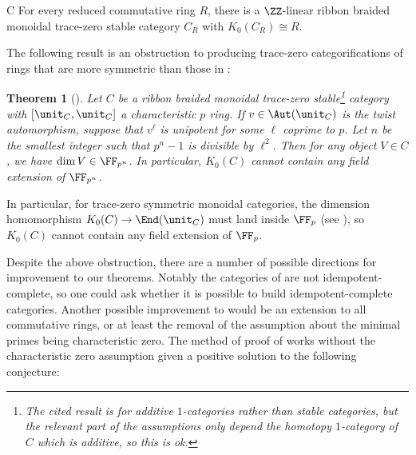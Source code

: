 \documentclass[12pt,oneside]{article}
\newcounter{counter}
\newtheorem{thm}[counter]{Theorem}
\newtheorem{lem}[counter]{Lemma}
\begin{document}
	\begin{customthm}{C}\label{thm:trzero}
		For every reduced commutative ring $R$, there is a $\ZZ$-linear ribbon braided monoidal trace-zero stable category $C_R$ with $K_0(C_R) \cong R$.
	\end{customthm}

	The following result is an obstruction to producing trace-zero categorifications of rings that are more symmetric than those in :

	\begin{thm}[{\cite[Theorem 5.15]{etingof2021lectures}}]\label{thm:obstruction}
			Let $C$ be a ribbon braided monoidal trace-zero stable\footnote{The cited result is for additive $1$-categories rather than stable categories, but the relevant part of the assumptions only depend the homotopy $1$-category of $C$ which is additive, so this is ok.} category with $[\unit_C,\unit_C]$ a characteristic $p$ ring. If $v\in \Aut(\unit_C)$ is the twist automorphism, suppose that $v^\ell$ is unipotent for some $\ell$ coprime to $p$. Let $n$ be the smallest integer such that $p^n-1$ is divisible by $\ell^2$. Then for any object $V \in C$, we have $\dim V \in \FF_{p^n}$. In particular, $K_0(C)$ cannot contain any field extension of $\FF_{p^n}$.
		\end{thm}
	In particular, for trace-zero symmetric monoidal categories, the dimension homomorphism $K_0(C) \to \End(\unit_C)$ must land inside $\FF_p$ (see \cite[Lemma 3.13]{etingof2021lectures}), so $K_0(C)$ cannot contain any field extension of $\FF_p$. 
	
	Despite the above obstruction, there are a number of possible directions for improvement to our theorems. Notably the categories of  are not idempotent-complete, so one could ask whether it is possible to build idempotent-complete categories. Another possible improvement to  would be an extension to all commutative rings, or at least the removal of the assumption about the minimal primes being characteristic zero. The method of proof of  works without the characteristic zero assumption given a positive solution to the following conjecture:
\end{document}
